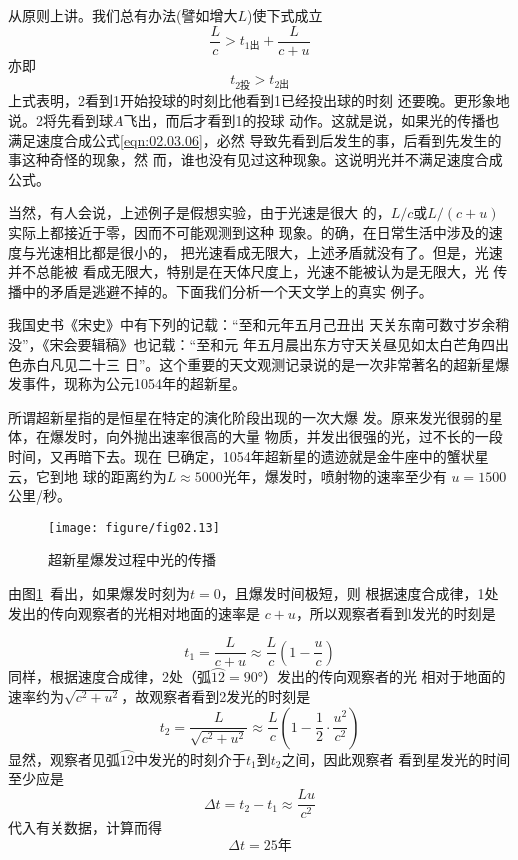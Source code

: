 \documentclass[../outline-of-mechanics.tex]{subfiles}
\begin{document}
从原则上讲。我们总有办法(譬如增大$L$)使下式成立
\begin{equation*}
  \frac{L}{c} > t_{1\text{出}} + \frac{L}{c+u}
\end{equation*}
亦即
\begin{equation*}
  t_{2\text{投}} > t_{2\text{出}}
\end{equation*}
上式表明，2看到1开始投球的时刻比他看到1已经投出球的时刻
还要晚。更形象地说。2将先看到球$A$飞出，而后才看到1的投球
动作。这就是说，如果光的传播也满足速度合成公式\eqref{eqn:02.03.06}，必然
导致先看到后发生的事，后看到先发生的事这种奇怪的现象，然
而，谁也没有见过这种现象。这说明光并不满足速度合成公式。

当然，有人会说，上述例子是假想实验，由于光速是很大
的，$L/c$或$L/\left(c+u\right)$实际上都接近于零，因而不可能观测到这种
现象。的确，在日常生活中涉及的速度与光速相比都是很小的，
把光速看成无限大，上述矛盾就没有了。但是，光速并不总能被
看成无限大，特别是在天体尺度上，光速不能被认为是无限大，光
传播中的矛盾是逃避不掉的。下面我们分析一个天文学上的真实
例子。

我国史书《宋史》中有下列的记载：“至和元年五月己丑出
天关东南可数寸岁余稍没”，《宋会要辑稿》也记载：“至和元
年五月晨出东方守天关昼见如太白芒角四出色赤白凡见二十三
日”。这个重要的天文观测记录说的是一次非常著名的超新星爆
发事件，现称为公元1054年的超新星。

所谓超新星指的是恒星在特定的演化阶段出现的一次大爆
发。原来发光很弱的星体，在爆发时，向外抛出速率很高的大量
物质，并发出很强的光，过不长的一段时间，又再暗下去。现在
巳确定，1054年超新星的遗迹就是金牛座中的蟹状星云，它到地
球的距离约为$L \approx 5000$光年，爆发时，喷射物的速率至少有
$u=1500$公里/秒。
\vspace{1em}
\begin{figure}[h]
  \centering
  \texttt{[image: figure/fig02.13]}
  \caption{超新星爆发过程中光的传播}
  \label{fig:02.13}
\end{figure}

由图\ref{fig:02.13}~看出，如果爆发时刻为$t=0$，且爆发时间极短，则
根据速度合成律，1处发出的传向观察者的光相对地面的速率是
$c+u$，所以观察者看到l发光的时刻是

\begin{equation*}
  t_{1}=\frac{L}{c+u} \approx \frac{L}{c}\left(1-\frac{u}{c}\right)
\end{equation*}
同样，根据速度合成律，2处（弧$\wideparen{12}=\ang{90;;}$）发出的传向观察者的光
相对于地面的速率约为$\sqrt{c^2 + u^2}$，故观察者看到2发光的时刻是
\begin{equation*}
  t_{2}=\frac{L}{\sqrt{c^{2}+u^{2}}} \approx \frac{L}{c}\left(1-\frac{1}{2} \cdot \frac{u^{2}}{c^{2}}\right)
\end{equation*}
显然，观察者见弧$\wideparen{12}$中发光的时刻介于$t_1$到$t_2$之间，因此观察者
看到星发光的时间至少应是
\begin{equation*}
  \Delta t=t_{2}-t_{1} \approx \frac{Lu}{c^{2}}
\end{equation*}
代入有关数据，计算而得
\begin{equation*}
  \Delta t=25\text{年}
\end{equation*}
\end{document}
